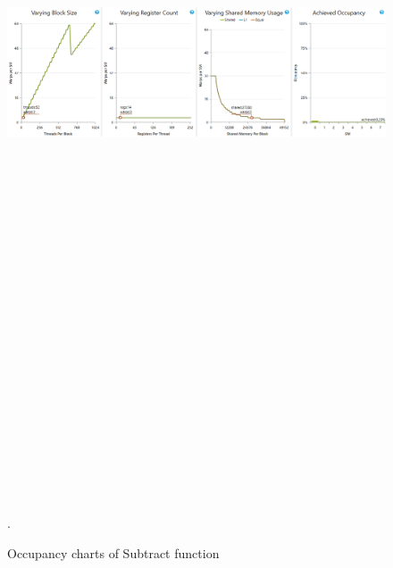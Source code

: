 \documentclass[oneside,openright,12pt,final,en]{mgr}
\begin{document}
\begin{figure}[H]
	\centering
	\includegraphics[width=\textwidth, height=26cm,keepaspectratio]{subtract_occupancy_charts}.
	\caption{Occupancy charts of Subtract function}
	\label{fig:subtract_occupancy_charts}
\end{figure}
\end{document}
